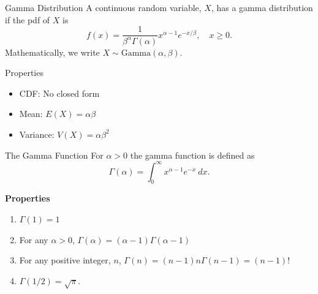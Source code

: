 \begin{frame}
  \begin{block}{Gamma Distribution}
    A continuous random variable, $X$, has a gamma distribution if the pdf of $X$ is
    \[
      f(x)=\frac{1}{\beta^\alpha\Gamma(\alpha)}x^{\alpha-1}e^{-x/\beta},\quad x \geq 0.
    \]
    Mathematically, we write $X \sim \mbox{Gamma}(\alpha,\beta)$.
  \end{block}

 \begin{block}{Properties}
        \begin{itemize}
        \item CDF: No closed form


        \item Mean: $E(X)=\alpha\beta$
      
        \item Variance: $V(X)=\alpha\beta^2$


        \end{itemize}
  \end{block}  
\end{frame}

\begin{frame}
  \begin{block}{The Gamma Function}
    For $\alpha>0$ the gamma function is defined as 
    \[
      \Gamma(\alpha)=\int_0^\infty x^{\alpha-1}e^{-x}~dx.
    \]
    
    \bigskip
    
    \textbf{Properties}
    \begin{enumerate}
    \item $\Gamma(1)=1$
    \item For any $\alpha>0$, $\Gamma(\alpha)=(\alpha-1)\Gamma(\alpha-1)$
    \item For any positive integer, $n$, $\Gamma(n)=(n-1)n\Gamma(n-1)=(n-1)!$
    \item $\Gamma(1/2)=\sqrt{\pi}$. 
    \end{enumerate}
  \end{block}
\end{frame}

